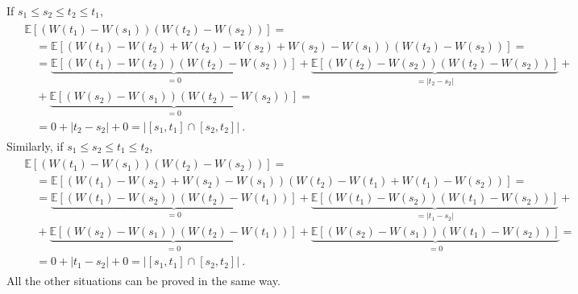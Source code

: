 \documentclass[letterpaper,10pt,english]{jupyterBook}
\begin{document}
\sphinxAtStartPar
If \(s_1 \le s_2 \le t_2 \le t_1\),
\begin{equation*}
\begin{split}\begin{aligned}
  & \mathbb{E}\left[ \left( W(t_1) - W(s_1) \right)  \left( W(t_2) - W(s_2) \right) \right] = \\
  & \quad = \mathbb{E}\left[ \left( W(t_1) - W(t_2) + W(t_2) - W(s_2) + W(s_2) - W(s_1) \right) \left( W(t_2) - W(s_2) \right) \right] = \\
  & \quad = \underbrace{\mathbb{E}\left[ \left( W(t_1) - W(t_2) \right) (W(t_2) - W(s_2) ) \right]}_{=0} 
          + \underbrace{\mathbb{E}\left[ \left( W(t_2) - W(s_2) \right) (W(t_2) - W(s_2) ) \right]}_{=|t_2 - s_2|} + \\
  & \quad + \underbrace{\mathbb{E}\left[ \left( W(s_2) - W(s_1) \right) (W(t_2) - W(s_2) ) \right]}_{= 0} = \\
  & \quad  = 0 + |t_2 - s_2| + 0 = \big| [s_1, t_1] \cap [s_2, t_2] \big| \ . 
\end{aligned}\end{split}
\end{equation*}
\sphinxAtStartPar
Similarly, if \(s_1 \le s_2 \le t_1 \le t_2 \),
\begin{equation*}
\begin{split}\begin{aligned}
  & \mathbb{E}\left[ \left( W(t_1) - W(s_1) \right)  \left( W(t_2) - W(s_2) \right) \right] = \\
  & \quad = \mathbb{E}\left[ \left( W(t_1) - W(s_2) + W(s_2) - W(s_1) \right) \left( W(t_2) - W(t_1) + W(t_1) - W(s_2) \right) \right] = \\
  & \quad = \underbrace{\mathbb{E}\left[ \left( W(t_1) - W(s_2) \right) (W(t_2) - W(t_1) ) \right]}_{=0} 
          + \underbrace{\mathbb{E}\left[ \left( W(t_1) - W(s_2) \right) (W(t_1) - W(s_2) ) \right]}_{=|t_1 - s_2|} + \\
  & \quad + \underbrace{\mathbb{E}\left[ \left( W(s_2) - W(s_1) \right) (W(t_2) - W(t_1) ) \right]}_{= 0}  
          + \underbrace{\mathbb{E}\left[ \left( W(s_2) - W(s_1) \right) (W(t_1) - W(s_2) ) \right]}_{= 0} = \\
  & \quad  = 0 + |t_1 - s_2| + 0 = \big| [s_1, t_1] \cap [s_2, t_2] \big| \ . 
\end{aligned}\end{split}
\end{equation*}
\sphinxAtStartPar
All the other situations can be proved in the same way.
\label{ch/prob/wiener:property-2}
\end{document}
